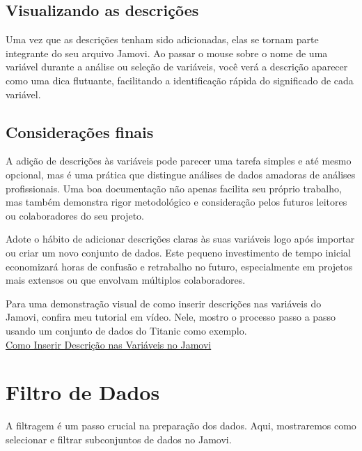 
\subsection{Visualizando as descrições}

Uma vez que as descrições tenham sido adicionadas, elas se tornam parte integrante do seu arquivo Jamovi. Ao passar o mouse sobre o nome de uma variável durante a análise ou seleção de variáveis, você verá a descrição aparecer como uma dica flutuante, facilitando a identificação rápida do significado de cada variável.

\subsection{Considerações finais}

A adição de descrições às variáveis pode parecer uma tarefa simples e até mesmo opcional, mas é uma prática que distingue análises de dados amadoras de análises profissionais. Uma boa documentação não apenas facilita seu próprio trabalho, mas também demonstra rigor metodológico e consideração pelos futuros leitores ou colaboradores do seu projeto.

Adote o hábito de adicionar descrições claras às suas variáveis logo após importar ou criar um novo conjunto de dados. Este pequeno investimento de tempo inicial economizará horas de confusão e retrabalho no futuro, especialmente em projetos mais extensos ou que envolvam múltiplos colaboradores.

\begin{tcolorbox}[colback=white,colframe=red,title={\faPlayCircle \ Dica de Conteúdo}]
  Para uma demonstração visual de como inserir descrições nas variáveis do Jamovi, confira meu tutorial em vídeo. Nele, mostro o processo passo a passo usando um conjunto de dados do Titanic como exemplo.\\
  \textcolor{red}{\faYoutube} \href{https://youtu.be/00HUaQaRt_E?si=JdYJKYGYpf6Orlox}{Como Inserir Descrição nas Variáveis no Jamovi}
\end{tcolorbox}


\section{Filtro de Dados}
A filtragem é um passo crucial na preparação dos dados. Aqui, mostraremos como selecionar e filtrar subconjuntos de dados no Jamovi.

